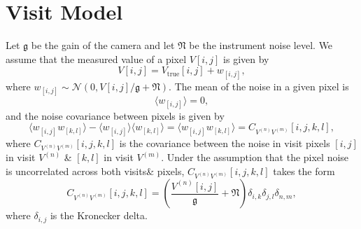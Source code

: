 \documentclass[times]{aastex6}
\begin{document}
\section{Visit Model}
Let $\mathfrak{g}$ be the gain of the camera and let $\mathfrak{N}$ be the instrument noise level. We assume that the measured value of a pixel $V[i,j]$ is given by
\begin{equation}\label{eq:PixelModel}
  V[i,j] = V_{\mathrm{true}}[i,j] + w_{[i,j]},
\end{equation}
where $w_{[i,j]} \sim \mathcal{N}(0, V[i,j]/\mathfrak{g} + \mathfrak{N})$.
The mean of the noise in a given pixel is
\begin{equation}\label{eq:NoiseMean}
  \langle w_{[i,j]} \rangle = 0,
\end{equation}
and the noise covariance between pixels is given by
\begin{equation}\label{eq:GenericNoiseCovariance}
  \langle w_{[i,j]}w_{[k,l]} \rangle - \langle w_{[i,j]} \rangle \langle w_{[k,l]} \rangle = \langle w_{[i,j]}w_{[k,l]} \rangle = C_{V^{(n)}V^{(m)}}[i,j,k,l],
\end{equation}
where $C_{V^{(n)}V^{(m)}}[i,j,k,l]$ is the covariance between the noise in visit pixels $[i,j]$ in visit $V^{(n)}$ \& $[k,l]$ in visit $V^{(m)}$. Under the assumption that the pixel noise is uncorrelated across both visits\& pixels, $C_{V^{(n)}V^{(m)}}[i,j,k,l]$ takes the form
\begin{equation}\label{eq:NoiseCovariance}
  C_{V^{(n)}V^{(m)}}[i,j,k,l] = \left ( \frac{V^{(n)}[i,j]}{\mathfrak{g}} + \mathfrak{N} \right )\delta_{i,k}\delta_{j,l}\delta_{n,m},
\end{equation}
where $\delta_{i,j}$ is the Kronecker delta.
\end{document}
